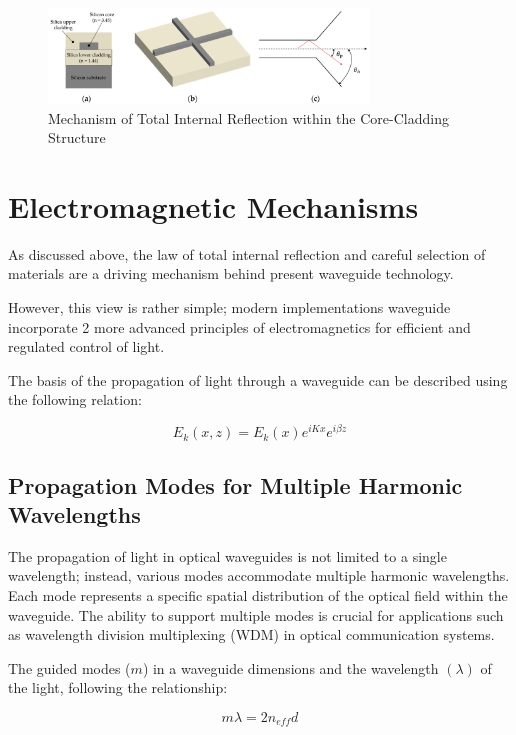 \documentclass[10pt]{article}
\begin{document}
\begin{figure}[h]
    \centering
    \includegraphics[width=8.5cm]{Silicon-Waveguide.png}
    \caption{Mechanism of Total Internal Reflection within the Core-Cladding Structure} 
    \end{figure}

\section{Electromagnetic Mechanisms}

As discussed above, the law of total internal reflection and careful selection of materials are a driving mechanism behind present waveguide technology.

However, this view is rather simple; modern implementations waveguide incorporate 2 more advanced principles of electromagnetics for 
efficient and regulated control of light. 

The basis of the propagation of light through a waveguide can be described using the following relation:

\begin{equation}
    E_k(x, z) = E_k(x)e^{iKx}e^{i\beta z}
\end{equation}

\subsection{Propagation Modes for Multiple Harmonic Wavelengths}
The propagation of light in optical waveguides is not limited to a single wavelength; instead, various modes accommodate multiple harmonic wavelengths. Each mode represents a specific spatial distribution of the optical field within the waveguide. The ability to support multiple modes is crucial for applications such as wavelength division multiplexing (WDM) in optical communication systems.

The guided modes ($m$) in a waveguide dimensions and the wavelength $(\lambda)$ of the light, following the relationship:

\begin{equation}
    m\lambda = 2n_{eff}d
\end{equation}
\end{document}
